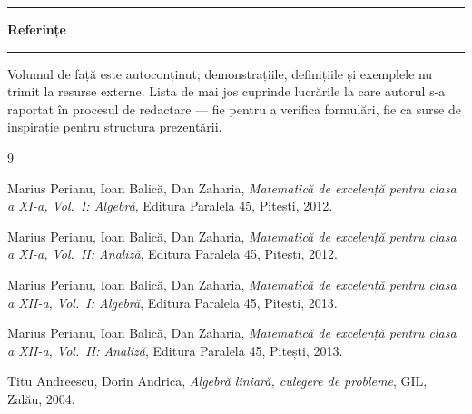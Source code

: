 \clearpage
\thispagestyle{empty}
\vspace*{1cm}
{\noindent\color{onm}\rule{\linewidth}{3pt}}\par\vspace{3mm}
{\noindent\fontsize{28}{32}\selectfont\bfseries\color{ink} Referințe}\par\vspace{3mm}
{\noindent\color{onm}\rule{\linewidth}{3pt}}\par\vspace{8mm}

\noindent Volumul de față este autoconținut; demonstrațiile, definițiile și exemplele nu trimit la resurse externe. Lista de mai jos cuprinde lucrările la care autorul s-a raportat în procesul de redactare --- fie pentru a verifica formulări, fie ca surse de inspirație pentru structura prezentării.

\vspace{6mm}
\begin{thebibliography}{9}

Marius Perianu, Ioan Balică, Dan Zaharia,
\textit{Matematică de excelență pentru clasa a XI-a, Vol.\ I: Algebră},
Editura Paralela 45, Pitești, 2012.

Marius Perianu, Ioan Balică, Dan Zaharia,
\textit{Matematică de excelență pentru clasa a XI-a, Vol.\ II: Analiză},
Editura Paralela 45, Pitești, 2012.

Marius Perianu, Ioan Balică, Dan Zaharia,
\textit{Matematică de excelență pentru clasa a XII-a, Vol.\ I: Algebră},
Editura Paralela 45, Pitești, 2013.

Marius Perianu, Ioan Balică, Dan Zaharia,
\textit{Matematică de excelență pentru clasa a XII-a, Vol.\ II: Analiză},
Editura Paralela 45, Pitești, 2013.

Titu Andreescu, Dorin Andrica,
\textit{Algebră liniară, culegere de probleme},
GIL, Zalău, 2004.

\end{thebibliography}

